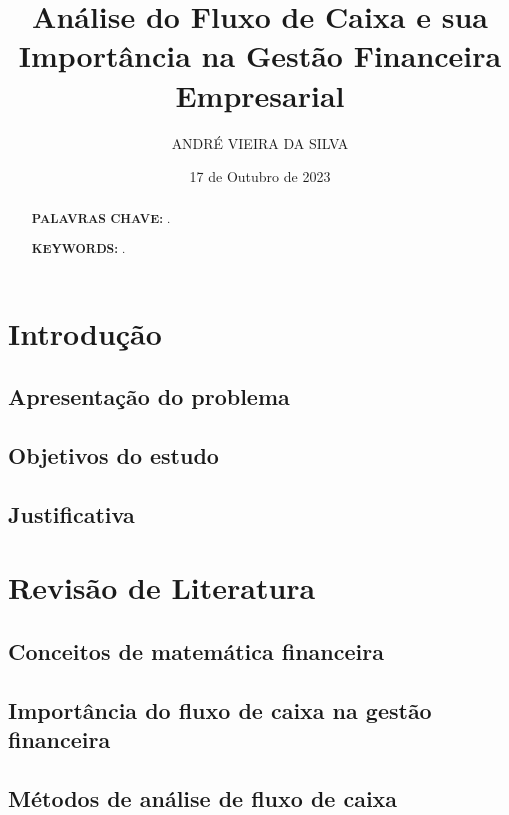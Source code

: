 \documentclass[a4paper,12pt]{article}
\title{ \textbf{\large Análise do Fluxo de Caixa e sua Importância na Gestão Financeira Empresarial}}
\author{ANDRÉ VIEIRA DA SILVA}
\date{17 de Outubro de 2023}
\begin{document}
\maketitle


\begin{abstract}
\textbf{PALAVRAS CHAVE: }.
\end{abstract}

\begin{abstract}

\textbf{KEYWORDS: }.
\end{abstract}


\newpage
\tableofcontents
\newpage



\section{Introdução}

\subsection{Apresentação do problema}
\subsection{Objetivos do estudo}
\subsection{Justificativa}

\section{Revisão de Literatura}

\subsection{Conceitos de matemática financeira}
\subsection{Importância do fluxo de caixa na gestão financeira}
\subsection{Métodos de análise de fluxo de caixa}
\end{document}
